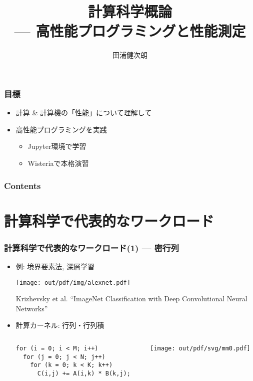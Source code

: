 \documentclass[10pt,dvipdfmx]{beamer}
\title{計算科学概論 \\
  --- 高性能プログラミングと性能測定}
\institute{工学部 電子情報工学科 \\
  情報理工学系研究科 電子情報学専攻}
\author{田浦健次朗}
\date{}
\begin{document}
\maketitle

\begin{frame}
\frametitle{目標}

\begin{itemize}
\item 計算 \& 計算機の「性能」について理解して
\item 高性能プログラミングを実践
  \begin{itemize}
  \item Jupyter環境で学習
  \item Wisteriaで本格演習
  \end{itemize}

\end{itemize}
\end{frame}

\begin{frame}
\frametitle{Contents}
\tableofcontents
\end{frame}

\section{計算科学で代表的なワークロード}

\begin{frame}[fragile]
\frametitle{計算科学で代表的なワークロード(1) --- 密行列}
\begin{itemize}
\item 例: 境界要素法, 深層学習
  \begin{center}
  \texttt{[image: out/pdf/img/alexnet.pdf]}
  
  {\tiny Krizhevsky et al. ``ImageNet Classification with Deep Convolutional Neural Networks''}
  \end{center}

\item 計算カーネル: 行列・行列積
\begin{columns}
\begin{column}{0.5\textwidth}
\begin{lstlisting}
for (i = 0; i < M; i++)    
  for (j = 0; j < N; j++)    
    for (k = 0; k < K; k++)
      C(i,j) += A(i,k) * B(k,j); 
\end{lstlisting}
\end{column}
\begin{column}{0.5\textwidth}
\texttt{[image: out/pdf/svg/mm0.pdf]}
\end{column}
\end{columns}
\end{itemize}
\end{frame}
\end{document}
